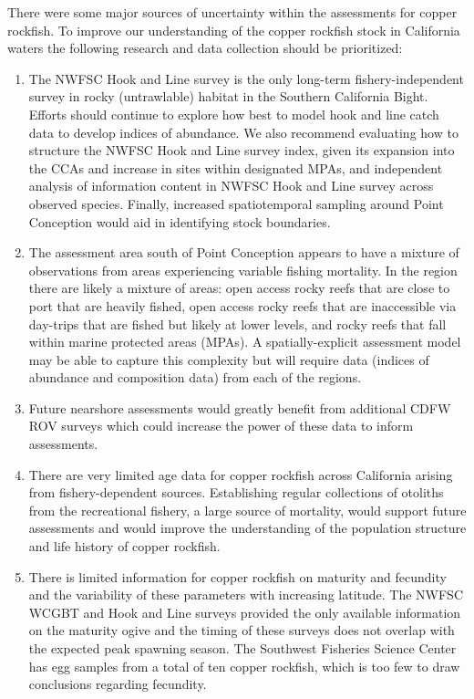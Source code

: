 \documentclass[11pt,
  english,
  letterpaper,
]{article}
\begin{document}
There were some major sources of uncertainty within the assessments for copper rockfish. To improve our understanding of the copper rockfish stock in California waters the following research and data collection should be prioritized:

\begin{enumerate}

  \item  The NWFSC Hook and Line survey is the only long-term fishery-independent survey in rocky (untrawlable) habitat in the Southern California Bight. Efforts should continue to explore how best to model hook and line catch data to develop indices of abundance. We also recommend evaluating how to structure the NWFSC Hook and Line survey index, given its expansion into the CCAs and increase in sites within designated MPAs, and independent analysis of information content in NWFSC Hook and Line survey across observed species. Finally, increased spatiotemporal sampling around Point Conception would aid in identifying stock boundaries.

    \item The assessment area south of Point Conception appears to have a mixture of observations from areas experiencing variable fishing mortality. In the region there are likely a mixture of areas: open access rocky reefs that are close to port that are heavily fished, open access rocky reefs that are inaccessible via day-trips that are fished but likely at lower levels, and rocky reefs that fall within marine protected areas (MPAs). A spatially-explicit assessment model may be able to capture this complexity but will require data (indices of abundance and composition data) from each of the regions. 
    
    \item Future nearshore assessments would greatly benefit from additional CDFW ROV surveys which could increase the power of these data to inform assessments.

    \item There are very limited age data for copper rockfish across California arising from fishery-dependent sources. Establishing regular collections of otoliths from the recreational fishery, a large source of mortality, would support future assessments and would improve the understanding of the population structure and life history of copper rockfish. 

    \item There is limited information for copper rockfish on maturity and fecundity and the variability of these parameters with increasing latitude.  The NWFSC WCGBT and Hook and Line surveys provided the only available information on the maturity ogive and the timing of these surveys does not overlap with the expected peak spawning season. The Southwest Fisheries Science Center has egg samples from a total of ten copper rockfish, which is too few to draw conclusions regarding fecundity.


\end{enumerate}
\end{document}
